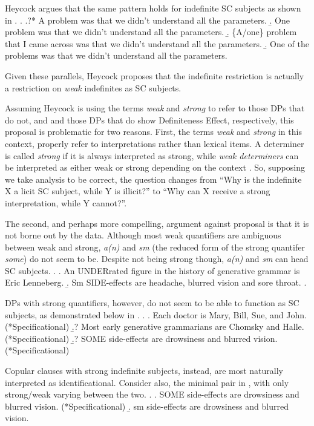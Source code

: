 \documentclass[GPFinal]{subfiles}
\begin{document}
Heycock argues that the same pattern holds for indefinite SC subjects as shown in \Next.
\ex.
\a.?* A problem was that we didn't understand all the parameters.
\b. One problem was that we didn't understand all the parameters.
\b. \{A/one\} problem that I came across was that we didn't understand all the parameters.
\b. One of the problems was that we didn't understand all the parameters.\hfill\parencite{heycock2012specification}

Given these parallels, Heycock proposes that the indefinite restriction is actually a restriction on \textit{weak} indefinites as SC subjects.

Assuming Heycock is using the terms \textit{weak} and \textit{strong} to refer to those DPs that do not, and and those DPs that do show  Definiteness Effect, respectively, 
this proposal is problematic for two reasons.
First, the terms \textit{weak} and \textit{strong} in this context, properly refer to interpretations rather than lexical items.
A determiner is called \textit{strong} if it is always interpreted as strong, while \textit{weak determiners} can be interpreted as either weak or strong depending on the context \parencite{diesing1992indefinites}.
So, supposing we take  analysis to be correct, the question changes from ``Why is the indefinite X a licit SC subject, while Y is illicit?'' to ``Why can X receive a strong interpretation, while Y cannot?''.

The second, and perhaps more compelling, argument against  proposal is that it is not borne out by the data.
Although most weak quantifiers are ambiguous between weak and strong, \textit{a(n)} and \textit{sm} (the reduced form of the strong quantifer \textit{some}) do not seem to be.
Despite not being strong though, \textit{a(n)} and \textit{sm} can head SC subjects.
\ex.
\a. An UNDERrated figure in the history of generative grammar is Eric Lenneberg.
\b. Sm SIDE-effects are headache, blurred vision and sore throat.
\z.

DPs with strong quantifiers, however, do not seem to be able to function as SC subjects, as demonstrated below in \Next.
\ex.
\a. Each doctor is Mary, Bill, Sue, and John. (*Specificational)
\b.? Most early generative grammarians are Chomsky and Halle. (*Specificational)
\b.? SOME side-effects are drowsiness and blurred vision. (*Specificational)

Copular clauses with strong indefinite subjects, instead, are most naturally interpreted as identificational.
Consider also, the minimal pair in \Next, with only strong/weak varying between the two.
\ex.
\a. SOME side-effects are drowsiness and blurred vision. (*Specificational)
\b. sm side-effects are drowsiness and blurred vision.
\end{document}
